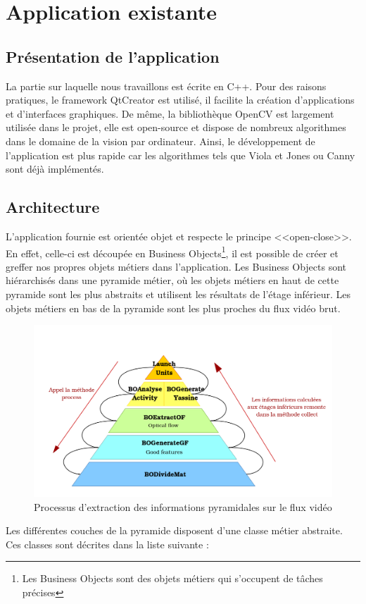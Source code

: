 \section{Application existante}

\subsection{Présentation de l'application}
La partie sur laquelle nous travaillons est écrite en C++. Pour des raisons pratiques, le framework 
QtCreator est utilisé, il facilite la création d'applications et d'interfaces graphiques. De même, 
la bibliothèque OpenCV  est largement utilisée dans le projet, elle est open-source et dispose de 
nombreux algorithmes dans le domaine de la vision par ordinateur. Ainsi, le développement de 
l'application est plus rapide car les algorithmes tels que Viola et Jones ou Canny sont déjà implémentés.

\subsection{Architecture}
L'application fournie est orientée objet et respecte le principe <<open-close>>. En effet, celle-ci est 
découpée en Business Objects\footnote{Les Business Objects sont des objets métiers qui s'occupent de tâches 
précises}, il est possible de créer et greffer nos propres objets métiers dans l'application. Les Business 
Objects sont hiérarchisés dans une pyramide métier, où les objets métiers en haut de cette pyramide 
sont les plus abstraits et utilisent les résultats de l'étage inférieur. Les objets métiers en bas de 
la pyramide sont les plus proches du flux vidéo brut.\\

\begin{figure}[H]
  \centering
  \includegraphics[width=15cm]{image/pyramide.png}
  \caption{Processus d'extraction des informations pyramidales sur le flux vidéo}
\end{figure}
\newpage
Les différentes couches de la pyramide disposent d'une classe métier abstraite. Ces classes 
sont décrites dans la liste suivante :\\

